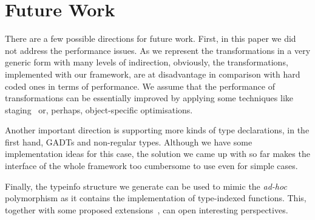 \section{Future Work}
\label{sec:futurework}

There are a few possible directions for future work. First, in this paper we did not address the performance issues. As we represent
the transformations in a very generic form with many levels of indirection, obviously, the transformations, implemented with
our framework, are at disadvantage in comparison with hard coded ones in terms of performance. We assume that the performance of transformations
can be essentially improved by applying some techniques like staging~\cite{Staged} or, perhaps, object-specific optimisations.

Another important direction is supporting more kinds of type declarations, in the first hand, GADTs and non-regular types. Although we have some
implementation ideas for this case, the solution we came up with so far makes the interface of the whole framework too cumbersome to use even for
simple cases.

Finally, the typeinfo structure we generate can be used to mimic the \emph{ad-hoc} polymorphism as it contains the implementation of
type-indexed functions. This, together with some proposed extensions~\cite{ModularImplicits}, can open interesting perspectives.

